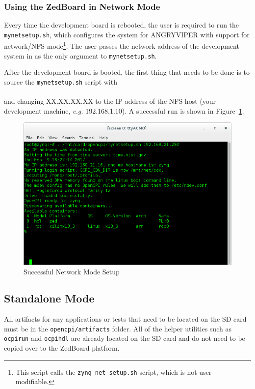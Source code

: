 \subsubsection*{Using the ZedBoard in Network Mode}
\begin{flushleft}
Every time the development board is rebooted, the user is required to run the \texttt{mynetsetup.sh}, which configures the system for ANGRYVIPER with support for network/NFS mode\footnote{This script calls the \texttt{zynq\_net\_setup.sh} script, which is not user-modifiable.}. The user passes the network address of the development system in as the only argument to \texttt{mynetsetup.sh}.
\end{flushleft}
\begin{flushleft}
\newpage
After the development board is booted, the first thing that needs to be done is to source the \texttt{mynetsetup.sh} script with\\
\leavevmode{\parindent=3em\indent}\\
and changing XX.XX.XX.XX to the IP address of the NFS host (your development machine, \textit{e.g.} 192.168.1.10). A successful run is shown in Figure~\ref{fig:netsetup}.
\end{flushleft}
\begin{figure}[H]
	\centerline{\includegraphics[scale=0.5]{zed_net_setup}}
	\caption{Successful Network Mode Setup}
	\label{fig:netsetup}
\end{figure}
\newpage
\subsection{Standalone Mode}
All artifacts for any applications or tests that need to be located on the SD card must be in the \texttt{opencpi/artifacts} folder.  All of the helper utilities such as \texttt{ocpirun} and \texttt{ocpihdl} are already located on the SD card and do not need to be copied over to the ZedBoard platform.


